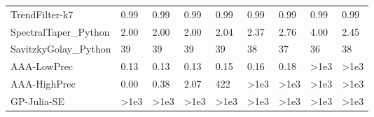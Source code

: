 \begin{table}
\begin{tabular}{lllllllll}
TrendFilter-k7 & 0.99 & 0.99 & 0.99 & 0.99 & 0.99 & 0.99 & 0.99 & 0.99 \\
SpectralTaper_Python & 2.00 & 2.00 & 2.00 & 2.04 & 2.37 & 2.76 & 4.00 & 2.45 \\
SavitzkyGolay_Python & 39 & 39 & 39 & 39 & 38 & 37 & 36 & 38 \\
AAA-LowPrec & 0.13 & 0.13 & 0.13 & 0.15 & 0.16 & 0.18 & >1e3 & >1e3 \\
AAA-HighPrec & 0.00 & 0.38 & 2.07 & 422 & >1e3 & >1e3 & >1e3 & >1e3 \\
GP-Julia-SE & >1e3 & >1e3 & >1e3 & >1e3 & >1e3 & >1e3 & >1e3 & >1e3 \\
\bottomrule
\end{tabular}
\end{table}
